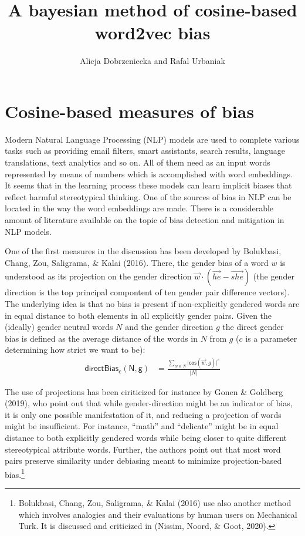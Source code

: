 \documentclass[
  10pt,
  dvipsnames,enabledeprecatedfontcommands]{scrartcl}
\title{A bayesian method of cosine-based word2vec bias}
\author{Alicja Dobrzeniecka and Rafal Urbaniak}
\date{}
\begin{document}
\maketitle

\tableofcontents

\hypertarget{cosine-based-measures-of-bias}{%
\section{Cosine-based measures of
bias}\label{cosine-based-measures-of-bias}}

Modern Natural Language Processing (NLP) models are used to complete
various tasks such as providing email filters, smart assistants, search
results, language translations, text analytics and so on. All of them
need as an input words represented by means of numbers which is
accomplished with word embeddings. It seems that in the learning process
these models can learn implicit biases that reflect harmful
stereotypical thinking. One of the sources of bias in NLP can be located
in the way the word embeddings are made. There is a considerable amount
of literature available on the topic of bias detection and mitigation in
NLP models.

One of the first measures in the discussion has been developed by
Bolukbasi, Chang, Zou, Saligrama, \& Kalai (2016). There, the gender
bias of a word \(w\) is understood as its projection on the gender
direction \(\vec{w} \cdot (\overrightarrow{he} - \overrightarrow{she})\)
(the gender direction is the top principal compontent of ten gender pair
difference vectors). The underlying idea is that no bias is present if
non-explicitly gendered words are in equal distance to both elements in
all explicitly gender pairs. Given the (ideally) gender neutral words
\(N\) and the gender direction \(g\) the direct gender bias is defined
as the average distance of the words in \(N\) from \(g\) (\(c\) is a
parameter determining how strict we want to be): \begin{align}
\mathsf{directBias_c(N,g)} & = \frac{\sum_{w\in N}\vert \mathsf{cos}(\vec{w},g)\vert^c}{\vert N \vert }
\end{align}

The use of projections has been ciriticized for instance by Gonen \&
Goldberg (2019), who point out that while gender-direction might be an
indicator of bias, it is only one possible manifestation of it, and
reducing a projection of words might be insufficient. For instance,
``math'' and ``delicate'' might be in equal distance to both explicitly
gendered words while being closer to quite different stereotypical
attribute words. Further, the authors point out that most word pairs
preserve similarity under debiasing meant to minimize projection-based
bias.\footnote{Bolukbasi, Chang, Zou, Saligrama, \& Kalai (2016) use
  also another method which involves analogies and their evaluations by
  human users on Mechanical Turk. It is discussed and criticized in
  (Nissim, Noord, \& Goot, 2020).}
\end{document}
